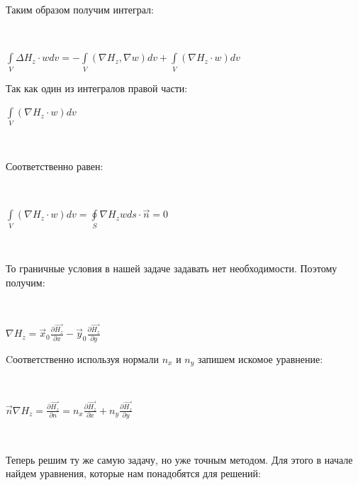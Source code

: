 \begin{flushleft}
	Таким образом получим интеграл:
\end{flushleft} \\

\begin{center}
	$ \int\limits_{V}^{} \Delta H_{z} \cdot wdv = - \int\limits_{V}^{}(\nabla H_{z}, \nabla w)dv +  \int\limits_{V}^{}(\nabla H_{z} \cdot w)dv
	$ \\
\end{center}

\begin{flushleft}
	Так как один из интегралов правой части: 
\end{flushleft}
\begin{center}
	$  \int\limits_{V}^{}(\nabla H_{z} \cdot w)dv $
\end{center} \\
\begin{flushleft}
	Соответственно равен: 
\end{flushleft}\\
\begin{center}
	$\int\limits_{V}^{}(\nabla H_{z} \cdot w)dv = \oint\limits_{S}^{} \nabla H_{z}  wds \cdot \vec{n} = 0 $ \\
\end{center}
\\
\begin{flushleft}
	То граничные условия в нашей задаче задавать нет необходимости.
	Поэтому получим:
\end{flushleft} \\

\begin{center}
	$ \nabla H_{z} = \vec{x}_{0} \frac{\partial\vec{H_{z}}}{\partial x} - \vec{y}_{0}
	\frac{\partial\vec{H_{z}}}{\partial y} $
	\\
\end{center}
\begin{flushleft}
	Cоответственно используя нормали $n_{x}$ и $n_{y}$  запишем искомое уравнение:
\end{flushleft} \\
\begin{center}
	$ \vec{n}\nabla H_{z} = \frac{\partial\vec{H_{z}}}{\partial n} = 
	n_{x}\frac{\partial\vec{H_{z}}}{\partial x} +
	n_{y}\frac{\partial\vec{H_{z}}}{\partial y} $
\end{center}

 \\
\begin{flushleft}
	Теперь решим ту же самую задачу, но уже точным методом. Для этого в начале найдем уравнения, которые нам понадобятся для решений:
\end{flushleft}\\

